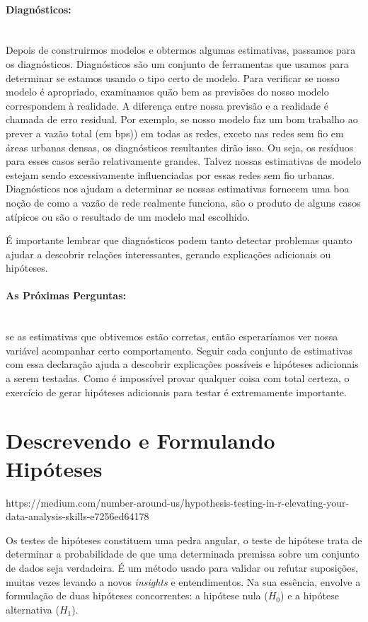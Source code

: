 \documentclass[article]{memoir}
\begin{document}
\paragraph*{Diagnósticos:}\mbox{}\\
Depois de construirmos modelos e obtermos algumas estimativas, passamos para os diagnósticos. Diagnósticos são um conjunto de ferramentas que usamos para determinar se estamos usando o tipo certo de modelo. Para verificar se nosso modelo é apropriado, examinamos quão bem as previsões do nosso modelo correspondem à realidade. A diferença entre nossa previsão e a realidade é chamada de erro residual. Por exemplo, se nosso modelo faz um bom trabalho ao prever a vazão total (em bps)) em todas as redes, exceto nas redes sem fio em áreas urbanas densas, os diagnósticos resultantes dirão isso. Ou seja, os resíduos para esses casos serão relativamente grandes. Talvez nossas estimativas de modelo estejam sendo excessivamente influenciadas por essas redes sem fio urbanas. Diagnósticos nos ajudam a determinar se nossas estimativas fornecem uma boa noção de como a vazão de rede realmente funciona, são o produto de alguns casos atípicos ou são o resultado de um modelo mal escolhido.

É importante lembrar que diagnósticos podem tanto detectar problemas quanto ajudar a descobrir relações interessantes, gerando explicações adicionais ou hipóteses. 

\paragraph*{As Próximas Perguntas:}\mbox{}\\
 se as estimativas que obtivemos estão corretas, então esperaríamos ver nossa variável acompanhar certo comportamento. Seguir cada conjunto de estimativas com essa declaração ajuda a descobrir explicações possíveis e hipóteses adicionais a serem testadas. Como é impossível provar qualquer coisa com total certeza, o exercício de gerar hipóteses adicionais para testar é extremamente importante. 

\section{Descrevendo e Formulando Hipóteses}
https://medium.com/number-around-us/hypothesis-testing-in-r-elevating-your-data-analysis-skills-e7256ed64178

Os testes de hipóteses constituem uma pedra angular, o teste de hipótese trata de determinar a probabilidade de que uma determinada premissa sobre um conjunto de dados seja verdadeira. É um método usado para validar ou refutar suposições, muitas vezes levando a novos \textit{insights} e entendimentos. Na sua essência, envolve a formulação de duas hipóteses concorrentes: a hipótese nula ($H_0$) e a hipótese alternativa ($H_1$).
\end{document}
